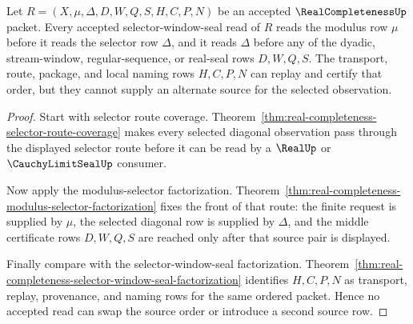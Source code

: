 \begin{theorem}
\label{thm:real-completeness-selector-window-source-determinacy}
Let $R=(X,\mu,\Delta,D,W,Q,S,H,C,P,N)$ be an accepted $\RealCompletenessUp$ packet. Every accepted selector-window-seal read of $R$ reads the modulus row $\mu$ before it reads the selector row $\Delta$, and it reads $\Delta$ before any of the dyadic, stream-window, regular-sequence, or real-seal rows $D,W,Q,S$. The transport, route, package, and local naming rows $H,C,P,N$ can replay and certify that order, but they cannot supply an alternate source for the selected observation.
\end{theorem}
\begin{proof}
Start with selector route coverage. Theorem~\ref{thm:real-completeness-selector-route-coverage} makes every selected diagonal observation pass through the displayed selector route before it can be read by a $\RealUp$ or $\CauchyLimitSealUp$ consumer.

Now apply the modulus-selector factorization. Theorem~\ref{thm:real-completeness-modulus-selector-factorization} fixes the front of that route: the finite request is supplied by $\mu$, the selected diagonal row is supplied by $\Delta$, and the middle certificate rows $D,W,Q,S$ are reached only after that source pair is displayed.

Finally compare with the selector-window-seal factorization. Theorem~\ref{thm:real-completeness-selector-window-seal-factorization} identifies $H,C,P,N$ as transport, replay, provenance, and naming rows for the same ordered packet. Hence no accepted read can swap the source order or introduce a second source row.
\end{proof}

